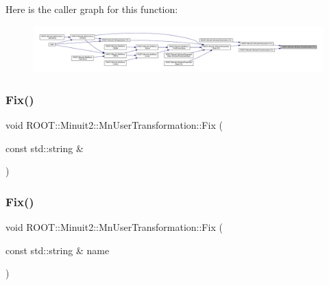 Here is the caller graph for this function\+:\nopagebreak
\begin{figure}[H]
\begin{center}
\leavevmode
\includegraphics[width=350pt]{d9/d98/classROOT_1_1Minuit2_1_1MnUserTransformation_ad3447936f5ae547aa3f80a76efa5e35d_icgraph}
\end{center}
\end{figure}
\mbox{\label{classROOT_1_1Minuit2_1_1MnUserTransformation_ad01d6c104e0c4a26c2ebb34db0ba1752}} 
\subsubsection{\texorpdfstring{Fix()}{Fix()}\hspace{0.1cm}{\footnotesize\ttfamily [3/4]}}
{\footnotesize\ttfamily void R\+O\+O\+T\+::\+Minuit2\+::\+Mn\+User\+Transformation\+::\+Fix (\begin{DoxyParamCaption}\item[{const std\+::string \&}]{ }\end{DoxyParamCaption})}

\mbox{\label{classROOT_1_1Minuit2_1_1MnUserTransformation_ad01d6c104e0c4a26c2ebb34db0ba1752}} 
\subsubsection{\texorpdfstring{Fix()}{Fix()}\hspace{0.1cm}{\footnotesize\ttfamily [4/4]}}
{\footnotesize\ttfamily void R\+O\+O\+T\+::\+Minuit2\+::\+Mn\+User\+Transformation\+::\+Fix (\begin{DoxyParamCaption}\item[{const std\+::string \&}]{name }\end{DoxyParamCaption})}

